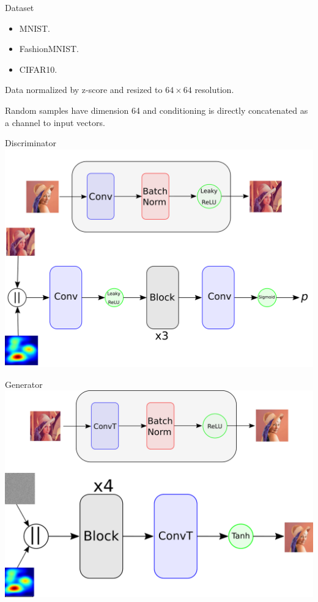 \documentclass{beamer}
\begin{document}
\begin{frame}{Dataset}
    \begin{itemize}
        \item MNIST.
        \item FashionMNIST.
        \item CIFAR10.
    \end{itemize}
    Data normalized by z-score and resized to $64 \times 64$ resolution.

    Random samples have dimension 64 and conditioning is directly concatenated as a channel to input vectors.
\end{frame}

\begin{frame}{Discriminator}
    \centering
    \includegraphics[scale=0.35]{images/discr.png}
\end{frame}

\begin{frame}{Generator}
    \centering
    \includegraphics[scale=0.35]{images/gen.png}
\end{frame}
\end{document}
